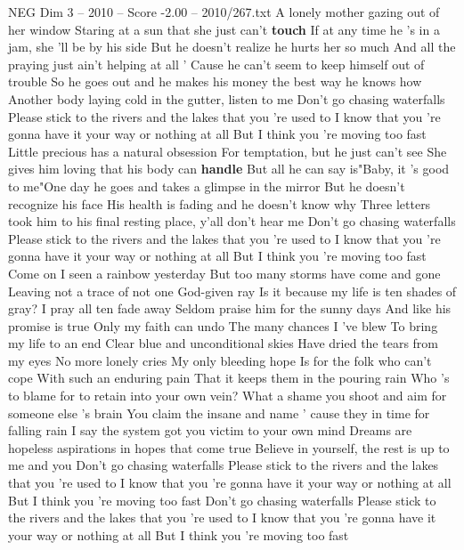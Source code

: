\begin{textsample}{NEG Dim 3 – 2010 – Score -2.00 – 2010/267.txt}  \label{ex:f3_neg_030}
A lonely mother gazing out of her window Staring at a sun that she just can't \textbf{touch} If at any time he 's in a jam, she 'll be by his side But he doesn't realize he hurts her so much And all the praying just ain't helping at all ' Cause he can't seem to keep himself out of trouble So he goes out and he makes his money the best way he knows how Another body laying cold in the gutter, listen to me Don't go chasing waterfalls Please stick to the rivers and the lakes that you 're used to I know that you 're gonna have it your way or nothing at all But I think you 're moving too fast Little precious has a natural obsession For temptation, but he just can't see She gives him loving that his body can \textbf{handle} But all he can say is"Baby, it 's good to me"One day he goes and takes a glimpse in the mirror But he doesn't recognize his face His health is fading and he doesn't know why Three letters took him to his final resting place, y'all don't hear me Don't go chasing waterfalls Please stick to the rivers and the lakes that you 're used to I know that you 're gonna have it your way or nothing at all But I think you 're moving too fast Come on I seen a rainbow yesterday But too many storms have come and gone Leaving not a trace of not one God-given ray Is it because my life is ten shades of gray?
I pray all ten fade away Seldom praise him for the sunny days And like his promise is true Only my faith can undo The many chances I 've blew To bring my life to an end Clear blue and unconditional skies Have dried the tears from my eyes No more lonely cries My only bleeding hope Is for the folk who can't cope With such an enduring pain That it keeps them in the pouring rain Who 's to blame for to retain into your own vein?
What a shame you shoot and aim for someone else 's brain You claim the insane and name ' cause they in time for falling rain I say the system got you victim to your own mind Dreams are hopeless aspirations in hopes that come true Believe in yourself, the rest is up to me and you Don't go chasing waterfalls Please stick to the rivers and the lakes that you 're used to I know that you 're gonna have it your way or nothing at all But I think you 're moving too fast Don't go chasing waterfalls Please stick to the rivers and the lakes that you 're used to I know that you 're gonna have it your way or nothing at all But I think you 're moving too fast

\end{textsample}
